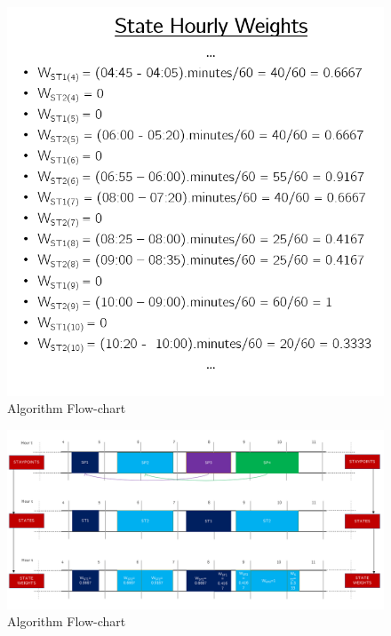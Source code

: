 \documentclass{article}
\begin{document}
\begin{figure}[h!]
\centering
\includegraphics[scale=.35]{stateweights.png}
\caption{Algorithm Flow-chart}
\label{fig:flow-chart}
\end{figure}

\begin{figure}[h!]
\centering
\includegraphics[scale=.54]{threestepsover.png}
\caption{Algorithm Flow-chart}
\label{fig:flow-chart}
\end{figure}
\end{document}
